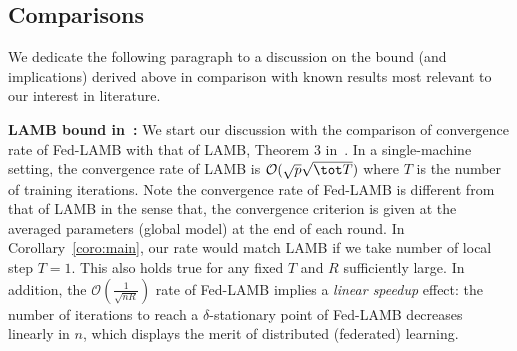 \documentclass[nohyperref]{article}
\theoremstyle{plain}
\theoremstyle{definition}
\theoremstyle{remark}
\begin{document}
\subsection{Comparisons}

We dedicate the following paragraph to a discussion on the bound (and implications) derived above in comparison with known results most relevant to our interest in literature.

\noindent\textbf{LAMB bound in~\citet{you2019large}: }
We start our discussion with the comparison of convergence rate of Fed-LAMB with that of LAMB, Theorem 3 in~\citet{you2019large}. In a single-machine setting, the convergence rate of LAMB is $\mathcal O(\sqrt{p}{\sqrt{\tot T}})$ where $T$ is the number of training iterations. Note the convergence rate of Fed-LAMB is different from that of LAMB in the sense that, the convergence criterion is given at the averaged parameters (global model) at the end of each round. In Corollary~\ref{coro:main}, our rate would match LAMB if we take number of local step $T=1$. This also holds true for any fixed $T$ and $R$ sufficiently large. In addition, the $\mathcal O(\frac{1}{\sqrt{nR}})$ rate of Fed-LAMB implies a \textit{linear speedup} effect: the number of iterations to reach a $\delta$-stationary point of Fed-LAMB decreases linearly in $n$, which displays the merit of distributed (federated) learning. 




 
\end{document}
